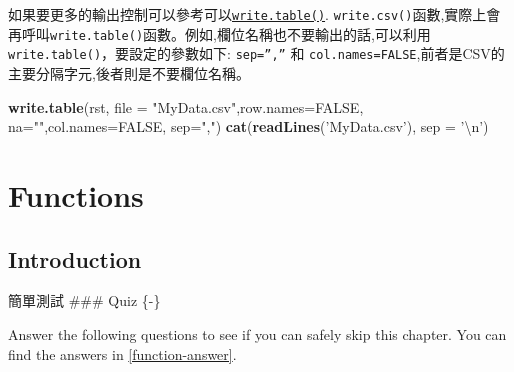 \documentclass[]{book}
\newenvironment{Shaded}{\begin{snugshade}}{\end{snugshade}}
\newcommand{\KeywordTok}[1]{\textcolor[rgb]{0.13,0.29,0.53}{\textbf{#1}}}
\newcommand{\DataTypeTok}[1]{\textcolor[rgb]{0.13,0.29,0.53}{#1}}
\newcommand{\CharTok}[1]{\textcolor[rgb]{0.31,0.60,0.02}{#1}}
\newcommand{\StringTok}[1]{\textcolor[rgb]{0.31,0.60,0.02}{#1}}
\newcommand{\OtherTok}[1]{\textcolor[rgb]{0.56,0.35,0.01}{#1}}
\newcommand{\NormalTok}[1]{#1}
\theoremstyle{definition}
\theoremstyle{definition}
\theoremstyle{definition}
\theoremstyle{remark}
\begin{document}
如果要更多的輸出控制可以參考可以\href{http://stat.ethz.ch/R-manual/R-devel/library/utils/html/write.table.html}{\texttt{write.table()}}.
\texttt{write.csv()}函數,實際上會再呼叫\texttt{write.table()}函數。例如,欄位名稱也不要輸出的話,可以利用\texttt{write.table()}，要設定的參數如下:
\texttt{sep=”,”} 和
\texttt{col.names=FALSE},前者是CSV的主要分隔字元,後者則是不要欄位名稱。

\begin{Shaded}
\begin{Highlighting}[]
\KeywordTok{write.table}\NormalTok{(rst, }\DataTypeTok{file =} \StringTok{"MyData.csv"}\NormalTok{,}\DataTypeTok{row.names=}\OtherTok{FALSE}\NormalTok{, }\DataTypeTok{na=}\StringTok{""}\NormalTok{,}\DataTypeTok{col.names=}\OtherTok{FALSE}\NormalTok{, }\DataTypeTok{sep=}\StringTok{","}\NormalTok{)}
\KeywordTok{cat}\NormalTok{(}\KeywordTok{readLines}\NormalTok{(}\StringTok{'MyData.csv'}\NormalTok{), }\DataTypeTok{sep =} \StringTok{'}\CharTok{\textbackslash{}n}\StringTok{'}\NormalTok{)}
\end{Highlighting}
\end{Shaded}

\chapter{Functions}\label{functions}

\section{Introduction}\label{introduction}

簡單測試 \#\#\# Quiz \{-\}

Answer the following questions to see if you can safely skip this
chapter. You can find the answers in \ref{function-answer}.
\end{document}
